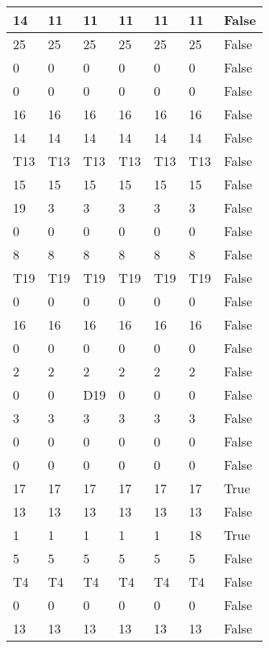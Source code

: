 \begin{longtable}[htbp]{| p{} | p{} | p{}| p{}| p{}| p{}| p{}|}
14 & 11 & 11 & 11 & 11 & 11 & False \\ \hline
25 & 25 & 25 & 25 & 25 & 25 & False \\ \hline
0 & 0 & 0 & 0 & 0 & 0 & False \\ \hline
0 & 0 & 0 & 0 & 0 & 0 & False \\ \hline
16 & 16 & 16 & 16 & 16 & 16 & False \\ \hline
14 & 14 & 14 & 14 & 14 & 14 & False \\ \hline
\multicolumn{1}{|l|}{T13} & \multicolumn{1}{l|}{T13} & \multicolumn{1}{l|}{T13} & \multicolumn{1}{l|}{T13} & \multicolumn{1}{l|}{T13} & \multicolumn{1}{l|}{T13} & False \\ \hline
15 & 15 & 15 & 15 & 15 & 15 & False \\ \hline
19 & 3 & 3 & 3 & 3 & 3 & False \\ \hline
0 & 0 & 0 & 0 & 0 & 0 & False \\ \hline
8 & 8 & 8 & 8 & 8 & 8 & False \\ \hline
\multicolumn{1}{|l|}{T19} & \multicolumn{1}{l|}{T19} & \multicolumn{1}{l|}{T19} & \multicolumn{1}{l|}{T19} & \multicolumn{1}{l|}{T19} & \multicolumn{1}{l|}{T19} & False \\ \hline
0 & 0 & 0 & 0 & 0 & 0 & False \\ \hline
16 & 16 & 16 & 16 & 16 & 16 & False \\ \hline
0 & 0 & 0 & 0 & 0 & 0 & False \\ \hline
2 & 2 & 2 & 2 & 2 & 2 & False \\ \hline
0 & 0 & \multicolumn{1}{l|}{D19} & 0 & 0 & 0 & False \\ \hline
3 & 3 & 3 & 3 & 3 & 3 & False \\ \hline
0 & 0 & 0 & 0 & 0 & 0 & False \\ \hline
0 & 0 & 0 & 0 & 0 & 0 & False \\ \hline
17 & 17 & 17 & 17 & 17 & 17 & True \\ \hline
13 & 13 & 13 & 13 & 13 & 13 & False \\ \hline
1 & 1 & 1 & 1 & 1 & 18 & True \\ \hline
5 & 5 & 5 & 5 & 5 & 5 & False \\ \hline
\multicolumn{1}{|l|}{T4} & \multicolumn{1}{l|}{T4} & \multicolumn{1}{l|}{T4} & \multicolumn{1}{l|}{T4} & \multicolumn{1}{l|}{T4} & \multicolumn{1}{l|}{T4} & False \\ \hline
0 & 0 & 0 & 0 & 0 & 0 & False \\ \hline
13 & 13 & 13 & 13 & 13 & 13 & False \\ \hline

\end{longtable}
